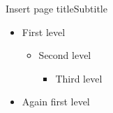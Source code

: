 \documentclass[t,8pt]{beamer}
\begin{document}
\begin{frame}{Insert page title}{Subtitle}
  \begin{itemize}
    \item First level
    \begin{itemize}
        \item Second level
        \begin{itemize}
            \item Third level
        \end{itemize}
    \end{itemize}
    \item Again first level
\end{itemize}
\end{frame}
\end{document}
